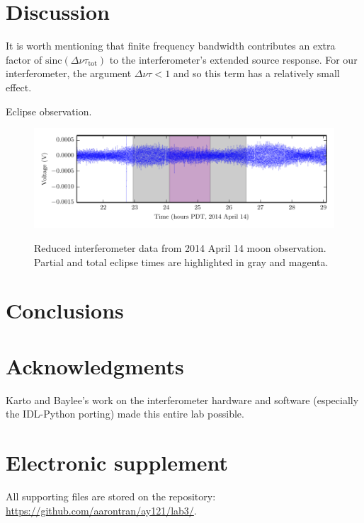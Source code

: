 \documentclass[10pt]{article}
\newcommand {\mt}{\mathrm}
\begin{document}
\section{Discussion}

It is worth mentioning that finite frequency bandwidth contributes an extra factor of $\mathrm{sinc} (\Delta\nu \tau_{\mt{tot}})$ to the interferometer's extended source response.  For our interferometer, the argument $\Delta\nu\tau < 1$ and so this term has a relatively small effect.

Eclipse observation.

\begin{figure}[!ht]
    \centering
    \includegraphics{plots/moon_eclipse_nice_clean.pdf} \\
    \caption{Reduced interferometer data from 2014 April 14 moon observation.  Partial and total eclipse times are highlighted in gray and magenta.}
    \label{fig:eclipse}
\end{figure}

\section{Conclusions}



\section{Acknowledgments}

Karto and Baylee's work on the interferometer hardware and software (especially the IDL-Python porting) made this entire lab possible.

\section{Electronic supplement}

All supporting files are stored on the repository:\\
\href{https://github.com/aarontran/ay121}
{https://github.com/aarontran/ay121/lab3/}.
\end{document}
